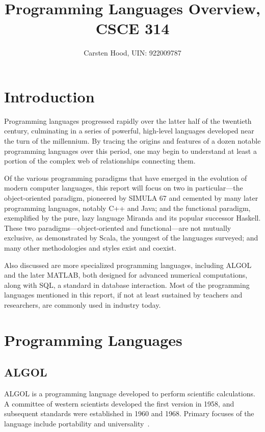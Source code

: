 \documentclass{article}
\title{Programming Languages Overview, CSCE 314}
\author{Carsten Hood, UIN: 922009787}
\begin{document}
\maketitle

\section{Introduction}

Programming languages progressed rapidly over the latter half of the twentieth century, culminating in a series of powerful, high-level languages developed near the turn of the millennium. By tracing the origins and features of a dozen notable programming languages over this period, one may begin to understand at least a portion of the complex web of relationships connecting them.

Of the various programming paradigms that have emerged in the evolution of modern computer languages, this report will focus on two in particular---the object-oriented paradigm, pioneered by SIMULA 67 and cemented by many later programming languages, notably C++ and Java; and the functional paradigm, exemplified by the pure, lazy language Miranda and its popular successor Haskell. These two paradigms---object-oriented and functional---are not mutually exclusive, as demonstrated by Scala, the youngest of the languages surveyed; and many other methodologies and styles exist and coexist.

Also discussed are more specialized programming languages, including ALGOL and the later MATLAB, both designed for advanced numerical computations, along with SQL, a standard in database interaction. Most of the programming languages mentioned in this report, if not at least sustained by teachers and researchers, are commonly used in industry today.

\section{Programming Languages}

\subsection{ALGOL}

ALGOL is a programming language developed to perform scientific calculations. A committee of western scientists developed the first version in 1958, and subsequent standards were established in 1960 and 1968. Primary focuses of the language include portability and universality~\cite{algol1}.
\end{document}
